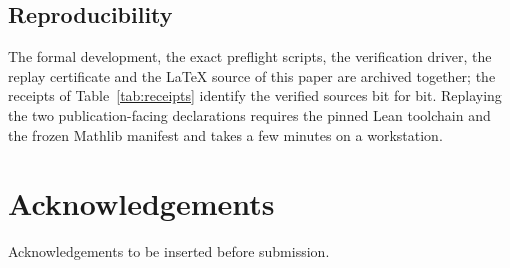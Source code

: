 \documentclass[11pt,a4paper]{article}
\theoremstyle{plain}
\theoremstyle{definition}
\theoremstyle{remark}
\begin{document}
\subsection{Reproducibility}

The formal development, the exact preflight scripts, the verification driver, the replay certificate and the LaTeX source of this paper are archived together; the receipts of Table~\ref{tab:receipts} identify the verified sources bit for bit. Replaying the two publication-facing declarations requires the pinned Lean toolchain and the frozen Mathlib manifest and takes a few minutes on a workstation.

\section*{Acknowledgements}
Acknowledgements to be inserted before submission.



\end{document}
